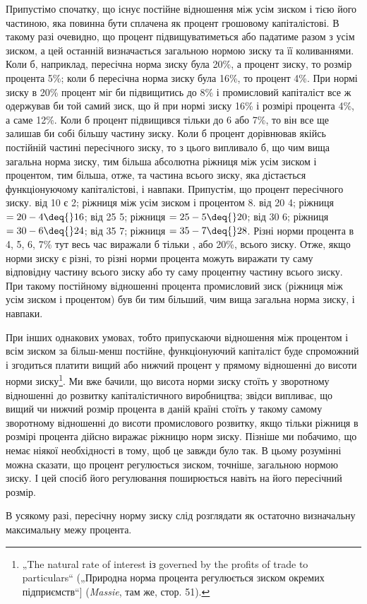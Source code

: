 
Припустімо спочатку, що існує постійне відношення між усім
зиском і тією його частиною, яка повинна бути сплачена як процент
грошовому капіталістові. В такому разі очевидно, що процент
підвищуватиметься або падатиме разом з усім зиском, а цей
останній визначається загальною нормою зиску та її коливаннями.
Коли б, наприклад, пересічна норма зиску була \deq{} 20\%, а процент
\deq{}  зиску, то розмір процента \deq{} 5\%; коли б пересічна
норма зиску була \deq{} 16\%, то процент \deq{} 4\%. При нормі зиску в
20\% процент міг би підвищитись до 8\% і промисловий капіталіст
все ж одержував би той самий зиск, що й при нормі зиску
\deq{} 16\% і розмірі процента \deq{} 4\%, а саме 12\%. Коли б процент
підвищився тільки до 6 або 7\%, то він все ще залишав би собі
більшу частину зиску. Коли б процент дорівнював якійсь постійній
частині пересічного зиску, то з цього випливало б, що
чим вища загальна норма зиску, тим більша абсолютна ріжниця
між усім зиском і процентом, тим більша, отже, та частина
всього зиску, яка дістається функціонуючому капіталістові, і навпаки.
Припустім, що процент \deq{}  пересічного зиску.  від 10
є 2; ріжниця між усім зиском і процентом \deq{} 8.  від 20 \deq{} 4;
ріжниця $= 20 - 4 \deq{} 16$;  від 25 \deq{} 5; ріжниця $= 25 - 5 \deq{} 20$;  від
30 \deq{} 6; ріжниця $= 30 - 6 \deq{} 24$;  від 35 \deq{} 7; ріжниця $= 35 - 7 \deq{} 28$.
Різні норми процента в 4, 5, 6, 7\% тут весь час виражали б
тільки , або 20\%, всього зиску. Отже, якщо норми зиску є різні,
то різні норми процента можуть виражати ту саму відповідну
частину всього зиску або ту саму процентну частину всього
зиску. При такому постійному відношенні процента промисловий
зиск (ріжниця між усім зиском і процентом) був би тим більший,
чим вища загальна норма зиску, і навпаки.

При інших однакових умовах, тобто припускаючи відношення
між процентом і всім зиском за більш-менш постійне, функціонуючий
капіталіст буде спроможний і згодиться платити вищий
або нижчий процент у прямому відношенні до висоти норми
зиску\footnote{
„The natural rate of interest із governed by the profits of trade to particulars“
(„Природна норма процента регулюється зиском окремих підприємств“]
(\emph{Massie}, там же, стор. 51).
}. Ми вже бачили, що висота норми зиску стоїть у зворотному
відношенні до розвитку капіталістичного виробництва;
звідси випливає, що вищий чи нижчий розмір процента в даній
країні стоїть у такому самому зворотному відношенні до висоти
промислового розвитку, якщо тільки ріжниця в розмірі
процента дійсно виражає ріжницю норм зиску. Пізніше ми побачимо,
що немає ніякої необхідності в тому, щоб це завжди
було так. В цьому розумінні можна сказати, що процент регулюється
зиском, точніше, загальною нормою зиску. І цей спосіб
його регулювання поширюється навіть на його пересічний розмір.

В усякому разі, пересічну норму зиску слід розглядати як
остаточно визначальну максимальну межу процента.
